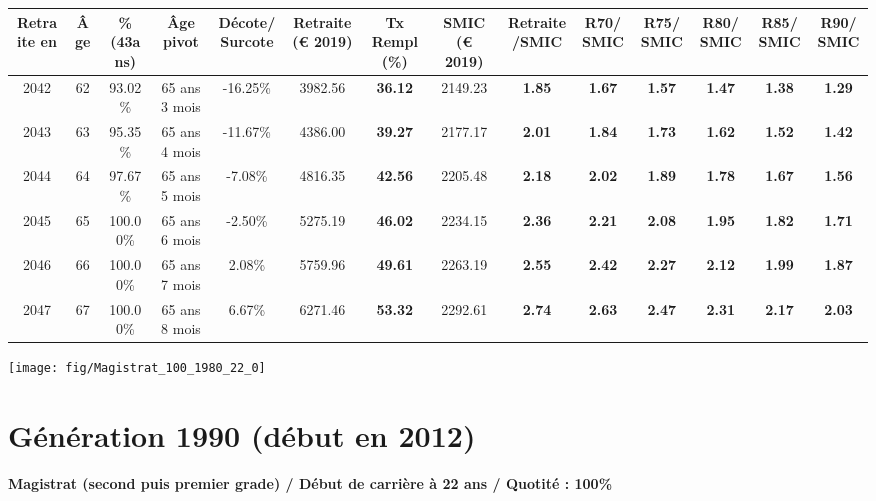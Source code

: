 \begin{adjustbox}{max width=\textwidth} 
\begin{tabular}[htb]{|c|c||c|c|c||c|c||c|c||c|c|c|c|c|} 
\hline 
 Retraite en &  Âge &  \%(43ans) &  Âge pivot &  Décote/Surcote &  Retraite (\euro{} 2019) &  Tx Rempl(\%) &  SMIC (\euro{} 2019) &  Retraite/SMIC &  R70/SMIC &  R75/SMIC &  R80/SMIC &  R85/SMIC &  R90/SMIC \\ 
\hline \hline 
 2042 &  62 &  93.02\% &  65 ans 3 mois &  -16.25\% &  3982.56 &  {\bf 36.12} &  2149.23 &  {\bf 1.85} &  {\bf 1.67} &  {\bf 1.57} &  {\bf 1.47} &  {\bf 1.38} &  {\bf 1.29} \\ 
\hline 
 2043 &  63 &  95.35\% &  65 ans 4 mois &  -11.67\% &  4386.00 &  {\bf 39.27} &  2177.17 &  {\bf 2.01} &  {\bf 1.84} &  {\bf 1.73} &  {\bf 1.62} &  {\bf 1.52} &  {\bf 1.42} \\ 
\hline 
 2044 &  64 &  97.67\% &  65 ans 5 mois &  -7.08\% &  4816.35 &  {\bf 42.56} &  2205.48 &  {\bf 2.18} &  {\bf 2.02} &  {\bf 1.89} &  {\bf 1.78} &  {\bf 1.67} &  {\bf 1.56} \\ 
\hline 
 2045 &  65 &  100.00\% &  65 ans 6 mois &  -2.50\% &  5275.19 &  {\bf 46.02} &  2234.15 &  {\bf 2.36} &  {\bf 2.21} &  {\bf 2.08} &  {\bf 1.95} &  {\bf 1.82} &  {\bf 1.71} \\ 
\hline 
 2046 &  66 &  100.00\% &  65 ans 7 mois &  2.08\% &  5759.96 &  {\bf 49.61} &  2263.19 &  {\bf 2.55} &  {\bf 2.42} &  {\bf 2.27} &  {\bf 2.12} &  {\bf 1.99} &  {\bf 1.87} \\ 
\hline 
 2047 &  67 &  100.00\% &  65 ans 8 mois &  6.67\% &  6271.46 &  {\bf 53.32} &  2292.61 &  {\bf 2.74} &  {\bf 2.63} &  {\bf 2.47} &  {\bf 2.31} &  {\bf 2.17} &  {\bf 2.03} \\ 
\hline 
\hline 
\end{tabular} 
\end{adjustbox} 
 
 \vspace{0.1cm} 

 {\hspace{-2.2cm}\texttt{[image: fig/Magistrat\_100\_1980\_22\_0]}} 

\newpage 
 
\section{Génération 1990 (début en 2012)\label{Magistrat_100_1990_22_0}} 
 
{\bf \noindent Magistrat (second puis premier grade) / Début de carrière à 22 ans / Quotité : 100\%}  ~ 

